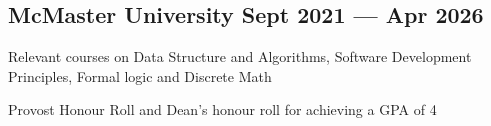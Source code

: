 
\subsection{{McMaster University \hfill Sept 2021 --- Apr 2026}}
\begin{zitemize}
    \item Relevant courses on \hspace{0.05cm}Data Structure and Algorithms, Software Development Principles, Formal logic and Discrete Math
    \item Provost Honour Roll and Dean's honour roll for achieving a GPA of 4

\end{zitemize}

